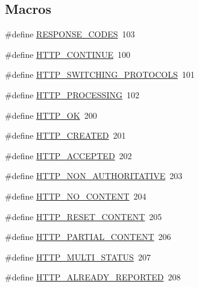\subsection*{Macros}
\begin{DoxyCompactItemize}
\item 
\#define \hyperlink{group__HTTP__Status_ga92c5b6a301e46085a0db6b9d0f36a1ce}{R\+E\+S\+P\+O\+N\+S\+E\+\_\+\+C\+O\+D\+ES}~103
\item 
\#define \hyperlink{group__HTTP__Status_ga3c520c5e65c710a1c7bbb1fa79fd3a9d}{H\+T\+T\+P\+\_\+\+C\+O\+N\+T\+I\+N\+UE}~100
\item 
\#define \hyperlink{group__HTTP__Status_gaa37bb5670913f3e1920e9271a604d763}{H\+T\+T\+P\+\_\+\+S\+W\+I\+T\+C\+H\+I\+N\+G\+\_\+\+P\+R\+O\+T\+O\+C\+O\+LS}~101
\item 
\#define \hyperlink{group__HTTP__Status_gaad76b47755281ea8ba65edc6683be8f9}{H\+T\+T\+P\+\_\+\+P\+R\+O\+C\+E\+S\+S\+I\+NG}~102
\item 
\#define \hyperlink{group__HTTP__Status_ga02e6d59009dee759528ec81fc9a8eeff}{H\+T\+T\+P\+\_\+\+OK}~200
\item 
\#define \hyperlink{group__HTTP__Status_gac19a79fb4cf575d20efd0633c1669ed9}{H\+T\+T\+P\+\_\+\+C\+R\+E\+A\+T\+ED}~201
\item 
\#define \hyperlink{group__HTTP__Status_gad53204f337b45ad77e9a746e434d1817}{H\+T\+T\+P\+\_\+\+A\+C\+C\+E\+P\+T\+ED}~202
\item 
\#define \hyperlink{group__HTTP__Status_gadee2fb81c1815ad215a41d304a1873c7}{H\+T\+T\+P\+\_\+\+N\+O\+N\+\_\+\+A\+U\+T\+H\+O\+R\+I\+T\+A\+T\+I\+VE}~203
\item 
\#define \hyperlink{group__HTTP__Status_gac5bae07abf22b6f4497500f9daa38bdc}{H\+T\+T\+P\+\_\+\+N\+O\+\_\+\+C\+O\+N\+T\+E\+NT}~204
\item 
\#define \hyperlink{group__HTTP__Status_ga425e6d17ace3dc2077df17c484570781}{H\+T\+T\+P\+\_\+\+R\+E\+S\+E\+T\+\_\+\+C\+O\+N\+T\+E\+NT}~205
\item 
\#define \hyperlink{group__HTTP__Status_ga9b80719aeec7415ec03e5fc0083f2dc3}{H\+T\+T\+P\+\_\+\+P\+A\+R\+T\+I\+A\+L\+\_\+\+C\+O\+N\+T\+E\+NT}~206
\item 
\#define \hyperlink{group__HTTP__Status_ga107ec20470907358953f6259538d45a1}{H\+T\+T\+P\+\_\+\+M\+U\+L\+T\+I\+\_\+\+S\+T\+A\+T\+US}~207
\item 
\#define \hyperlink{group__HTTP__Status_ga3fc573d9890dec0d6fdd6ff4fe953fd3}{H\+T\+T\+P\+\_\+\+A\+L\+R\+E\+A\+D\+Y\+\_\+\+R\+E\+P\+O\+R\+T\+ED}~208
\item 

\end{DoxyCompactItemize}
